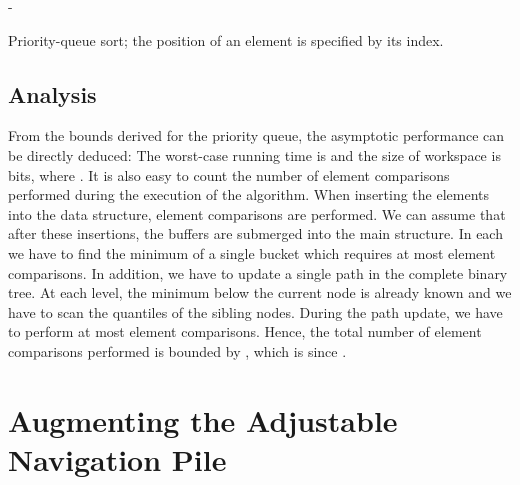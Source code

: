 \documentclass[final,onetabnum,onefignum,onethmnum]{siamltex}
\newcommand{\Extract}{\mbox{}}
\begin{document}
\begin{algorithm2e}[tb!]
\SetStartEndCondition{ }{}{}
\DontPrintSemicolon
\Proc{{\rm -}{\rm -}}

{\rm -}\;
\For {} {
  \;
}
\While {} {
  \;
  \;
  \;
}
\caption{Priority-queue sort; the position of an
  element is specified by its index.}
\label{sorting-algorithm}	
\end{algorithm2e}

\subsection{Analysis}  From the bounds derived for the priority queue,
the asymptotic performance can be directly deduced: The worst-case
running time is  and the size of workspace is
 bits, where . It is also easy to count the number of element
comparisons performed during the execution of the algorithm. When
inserting the  elements into the data structure,  element
comparisons are performed. We can assume that after these insertions,
the buffers are submerged into the main structure. In each \Extract{}
we have to find the minimum of a single bucket which requires at most
 element comparisons. In addition, we have to
update a single path in the complete binary tree. At each level, the
minimum below the current node is already known and we have to scan the
quantiles of the sibling nodes. During the path update, we have to perform
at most  element comparisons.
Hence, the total number of element comparisons performed is bounded by , 
which is  since . 

\section{Augmenting the Adjustable Navigation Pile}
\label{aug}
\end{document}

